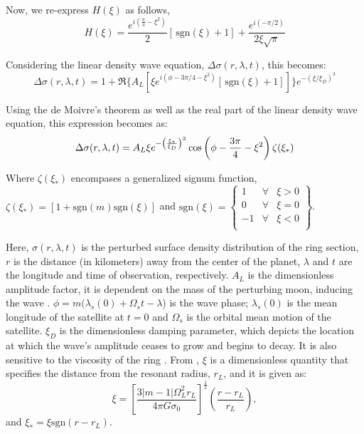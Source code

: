 \documentclass[conference]{IEEEtran}
\begin{document}
Now, we re-express  $H(\xi)$ as follows, 
\begin{equation}
    H(\xi) = \frac{e^{i(\frac{\pi}{4} - \xi^{2})}}{2}\left[\,\text{sgn}(\xi) + 1\right] + \frac{e^{i(-\pi/2)}}{2\xi \sqrt{\pi}}
\end{equation}

Considering the linear density wave equation, $\Delta \sigma(r,\lambda,t)$, this becomes:
\begin{equation}
\Delta \sigma(r,\lambda,t) = 1 + \Re\{A_{L}[\xi e^{i{(\phi - 3\pi/4 - \xi^{2})}}\left[\,\text{sgn}(\xi) + 1\right]]\} e^{-(\xi/\xi_{D})^{3}}
\end{equation}

Using the de Moivre's theorem as well as the real part of the linear density wave equation, this expression becomes as: 
\begin{equation}
   \Delta \sigma(r,\lambda,t) = A_{L}\xi\\e^{-\left(\frac{\xi_{*}}{\xi_{D}}\right)^3}\cos\left(\phi-\frac{3\pi}{4}-\xi^2\right)\zeta(\xi_{*})
\end{equation}

Where $\zeta(\xi_{*})$ encompases a generalized signum function, $\zeta(\xi_{*}) = [1 + \mathrm{sgn}(m)\mathrm{sgn}(\xi)]$  and $ \mathrm{sgn}(\xi) = \left\{ \begin{array}{rcl}
1 & \forall
& \xi>0 \\ 0 & \forall & \xi=0 \\ -1 & \forall & \xi<0 \\
\end{array}\right\}$.

\vspace{3pt}

Here, $\sigma(r,\lambda,t)$ is the perturbed surface density distribution of the ring section, $r$ is the distance (in kilometers) away from the center of the planet, $\lambda$ and $t$ are the longitude and time of observation, respectively. $A_{L}$ is the dimensionless amplitude factor, it is dependent on the mass of the perturbing moon, inducing the wave \cite{Tiscareno_2007}. $\phi = m(\lambda_{s}(0)+\Omega_{s}t-\lambda$) is the wave phase; $\lambda_{s}(0)$ is the mean longitude of the satellite at $t=0$ and $\Omega_{s}$ is the orbital mean motion of the satellite. $\xi_{D}$ is the dimensionless damping parameter, which depicts the location at which the wave's amplitude ceases to grow and begins to decay. It is also sensitive to the viscosity of the ring \cite{Tiscareno_2007}.
From \cite{Nicholson1990AnAR} \cite{1984prin.conf..513S}, $\xi$ is a dimensionless quantity that specifies the distance from the resonant radius, $r_{L}$, and it is given as:
\begin{equation}
\xi = \left[\frac{3|m-1|\Omega_{L}^{2}r_{L}}{4\pi G \sigma_{0}}\right]^{\frac{1}{2}}\left(\frac{r-r_{L}}{r_{L}}\right), 
\end{equation}
and $\xi_{*} = \xi \mathrm{sgn}(r - r_{L})$.
\end{document}
